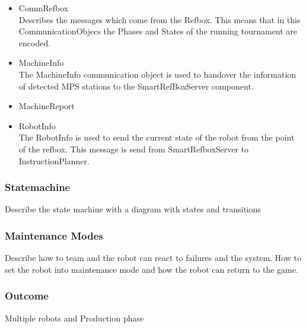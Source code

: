 \begin{itemize}

\item CommRefbox \\

Describes the messages which come from the Refbox. This means that in this CommunicationObjecs the 
Phases and States of the running tournament are encoded.

\item MachineInfo \\

The MachineInfo communication object is used to handover the information of detected MPS stations to the SmartRefBoxServer component. 

\item MachineReport \\

\item RobotInfo \\

The RobotInfo is used to send the current state of the robot from the point of the refbox. This message is send from SmartRefboxServer to InstructionPlanner. 

\end{itemize}


\subsubsection{Statemachine}

Describe the state machine with a diagram with states
and transitions

\subsubsection{Maintenance Modes}

Describe how to team and the robot can react to failures and the system. How to set the robot into maintenance mode and how the robot can return to the game. 


\subsubsection{Outcome}

Multiple robots and Production phase







